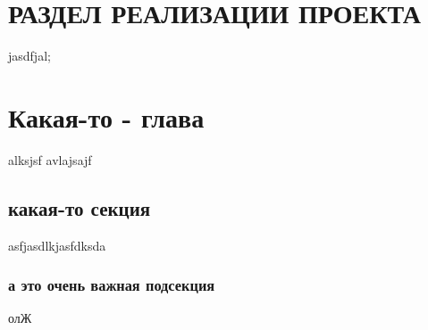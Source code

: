 \chapter*{РАЗДЕЛ РЕАЛИЗАЦИИ ПРОЕКТА}

jasdfjal;
\chapter{Какая-то - глава}
alksjsf
avlajsajf
\section{какая-то секция}
asfjasdlkjasfdksda
\subsection{а это очень важная подсекция}
олЖ

